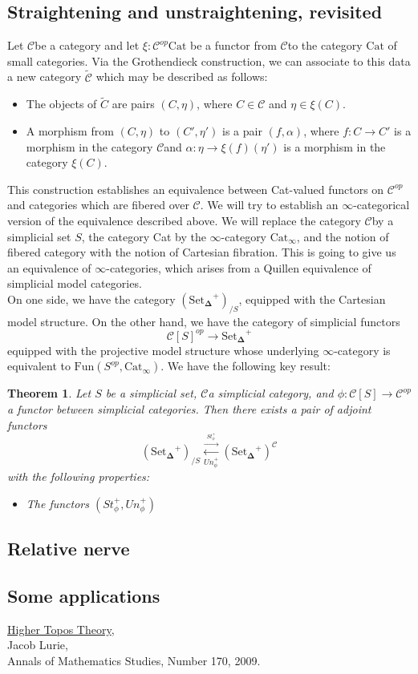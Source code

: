 \documentclass{amsart}
\newcommand{\8}{\ensuremath{\infty}}
\newcommand{\C}{\ensuremath{\mathscr{C}}}
\newcommand{\SSet}{\ensuremath{\text{Set}_{\boldsymbol{\Delta}}}}
\newcommand{\adj}[2]{\ensuremath{\overset{\overset{#1}{\rightarrow}}{\underset{#2}{\leftarrow}}}}
\newtheorem{theorem}{Theorem}
\begin{document}
\subsection{Straightening and unstraightening, revisited}
Let \C be a category and let $\xi:\C^{op}\text{Cat}$ be a functor from \C to the category $\text{Cat}$ of small categories. Via the Grothendieck construction, we can associate to this data a new category $\tilde{\C}$ which may be described as follows:

\begin{itemize}
  \item The objects of $\tilde{C}$ are pairs $(C,\eta)$, where $C\in\C$ and $\eta\in\xi(C)$.
  \item A morphism from $(C,\eta)$ to $(C', \eta')$ is a pair $(f,\alpha)$, where $f:C\rightarrow C'$ is a morphism in the category \C and $\alpha:\eta\rightarrow \xi(f)(\eta')$ is a morphism in the category $\xi(C)$.
\end{itemize}

This construction establishes an equivalence between Cat-valued functors on $\C^{op}$ and categories which are fibered over $\C$. We will try to establish an \8-categorical version of the equivalence described above. We will replace the category \C by a simplicial set $S$, the category Cat by the \8-category $\text{Cat}_{\8}$, and the notion of fibered category with the notion of Cartesian fibration. This is going to give us an equivalence of \8-categories, which arises from a Quillen equivalence of simplicial model categories. \\
On one side, we have the category $(\SSet^+)_{/S}$, equipped with the Cartesian model structure. On the other hand, we have the category of simplicial functors $$\mathscr{C}[S]^{op}\rightarrow \SSet^+$$ equipped with the projective model structure whose underlying \8-category is equivalent to $\text{Fun}(S^{op},\text{Cat}_\8). $ We have the following key result:

\begin{theorem}
  Let $S$ be a simplicial set, \C a simplicial category, and $\phi:\mathscr{C}[S]\rightarrow \C^{op}$ a functor between simplicial categories. Then there exists a pair of adjoint functors
  \[(\SSet^+)_{/S} \adj{St_\phi^+}{Un_\phi^+} (\SSet^+)^\C\]
  with the following properties:
  \begin{itemize}
    \item[(1)] The functors $(St_\phi^+, Un_\phi^+)$
  \end{itemize}


\end{theorem}

\subsection{Relative nerve}
\subsection{Some applications}


\begin{thebibliography}{99}
  \href{https://arxiv.org/abs/math/0608040}{Higher Topos Theory}, \\
  Jacob Lurie, \\
  Annals of Mathematics Studies, Number 170, 2009.
\end{thebibliography}
\end{document}
